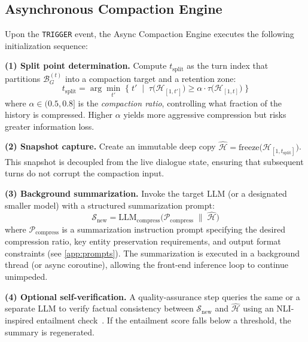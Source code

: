 \documentclass[10pt,twocolumn]{article}
\newcommand{\bufG}{\mathcal{B}_G}
\newcommand{\Dtok}{\tau}
\newcommand{\concat}{\;\|\;}
\begin{document}
\subsection{Asynchronous Compaction Engine}\label{sec:compaction}

Upon the \texttt{TRIGGER} event, the Async Compaction Engine executes the following initialization sequence:

\textbf{(1) Split point determination.} Compute $t_{\mathrm{split}}$ as the turn index that partitions $\bufG^{(t)}$ into a compaction target and a retention zone:
\begin{equation}\label{eq:split}
  t_{\mathrm{split}} = \arg\min_{t'} \;\bigl\{\; t' \;\;\big|\;\; \Dtok\bigl(\mathcal{H}_{[1, t']}\bigr) \geq \alpha \cdot \Dtok\bigl(\mathcal{H}_{[1, t]}\bigr) \;\bigr\}
\end{equation}
where $\alpha \in (0.5, 0.8]$ is the \emph{compaction ratio}, controlling what fraction of the history is compressed. Higher $\alpha$ yields more aggressive compression but risks greater information loss.

\textbf{(2) Snapshot capture.} Create an immutable deep copy $\hat{\mathcal{H}} = \text{freeze}\bigl(\mathcal{H}_{[1, t_{\mathrm{split}}]}\bigr)$. This snapshot is decoupled from the live dialogue state, ensuring that subsequent turns do not corrupt the compaction input.

\textbf{(3) Background summarization.} Invoke the target LLM (or a designated smaller model) with a structured summarization prompt:
\begin{equation}\label{eq:compress}
  \mathcal{S}_{\mathrm{new}} = \mathrm{LLM}_{\mathrm{compress}}\bigl(\mathcal{P}_{\mathrm{compress}} \concat \hat{\mathcal{H}}\bigr)
\end{equation}
where $\mathcal{P}_{\mathrm{compress}}$ is a summarization instruction prompt specifying the desired compression ratio, key entity preservation requirements, and output format constraints (see \cref{app:prompts}). The summarization is executed in a background thread (or async coroutine), allowing the front-end inference loop to continue unimpeded.

\textbf{(4) Optional self-verification.} A quality-assurance step queries the same or a separate LLM to verify factual consistency between $\mathcal{S}_{\mathrm{new}}$ and $\hat{\mathcal{H}}$ using an NLI-inspired entailment check~\cite{laban2022summac, min2023factscore}. If the entailment score falls below a threshold, the summary is regenerated.
\end{document}
